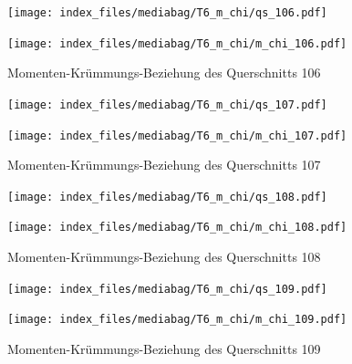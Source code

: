 \documentclass[
  11pt,
  letterpaper,
]{scrreprt}
\begin{document}
\begin{figure}[H]

\begin{minipage}{0.50\linewidth}
\texttt{[image: index\_files/mediabag/T6\_m\_chi/qs\_106.pdf]}\end{minipage}%
%
\begin{minipage}{0.50\linewidth}
\texttt{[image: index\_files/mediabag/T6\_m\_chi/m\_chi\_106.pdf]}\end{minipage}%

\caption{\label{fig-mchi_anhang}Momenten-Krümmungs-Beziehung des
Querschnitts 106}

\end{figure}%

\begin{figure}[H]

\begin{minipage}{0.50\linewidth}
\texttt{[image: index\_files/mediabag/T6\_m\_chi/qs\_107.pdf]}\end{minipage}%
%
\begin{minipage}{0.50\linewidth}
\texttt{[image: index\_files/mediabag/T6\_m\_chi/m\_chi\_107.pdf]}\end{minipage}%

\caption{\label{fig-mchi_anhang}Momenten-Krümmungs-Beziehung des
Querschnitts 107}

\end{figure}%

\begin{figure}[H]

\begin{minipage}{0.50\linewidth}
\texttt{[image: index\_files/mediabag/T6\_m\_chi/qs\_108.pdf]}\end{minipage}%
%
\begin{minipage}{0.50\linewidth}
\texttt{[image: index\_files/mediabag/T6\_m\_chi/m\_chi\_108.pdf]}\end{minipage}%

\caption{\label{fig-mchi_anhang}Momenten-Krümmungs-Beziehung des
Querschnitts 108}

\end{figure}%

\begin{figure}[H]

\begin{minipage}{0.50\linewidth}
\texttt{[image: index\_files/mediabag/T6\_m\_chi/qs\_109.pdf]}\end{minipage}%
%
\begin{minipage}{0.50\linewidth}
\texttt{[image: index\_files/mediabag/T6\_m\_chi/m\_chi\_109.pdf]}\end{minipage}%

\caption{\label{fig-mchi_anhang}Momenten-Krümmungs-Beziehung des
Querschnitts 109}

\end{figure}%
\end{document}
